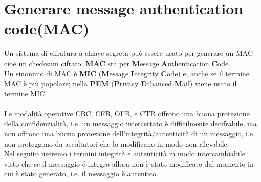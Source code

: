 \section{Generare message authentication code(MAC)}
Un sistema di cifratura a chiave segreta può essere usato per generare un MAC cioè un checksum cifrato: \textbf{MAC} sta per \textbf{M}essage \textbf{A}uthentication \textbf{C}ode. \\
Un sinonimo di MAC è \textbf{MIC} (\textbf{M}essage \textbf{I}ntegrity \textbf{C}ode) e, anche se il termine MAC è più popolare; nella \textbf{PEM} (\textbf{P}rivacy \textbf{E}nhanced \textbf{M}ail) viene usato il termine MIC.\\
\\
Le modalità operative CBC, CFB, OFB, e CTR offrono una buona protezione della confidenzialità, i.e. un messaggio intercettato è difficilmente decifrabile, ma non offrono una buona protezione dell'integrità/autenticità di un messaggio, i.e. non proteggono da ascoltatori che lo modificano in modo non rilevabile.\\
Nel seguito useremo i termini integrità e autenticità in modo intercambiabile visto che se il messaggio é integro allora non è stato modificato dal momento in cui è stato generato, i.e. il messaggio è autentico.
